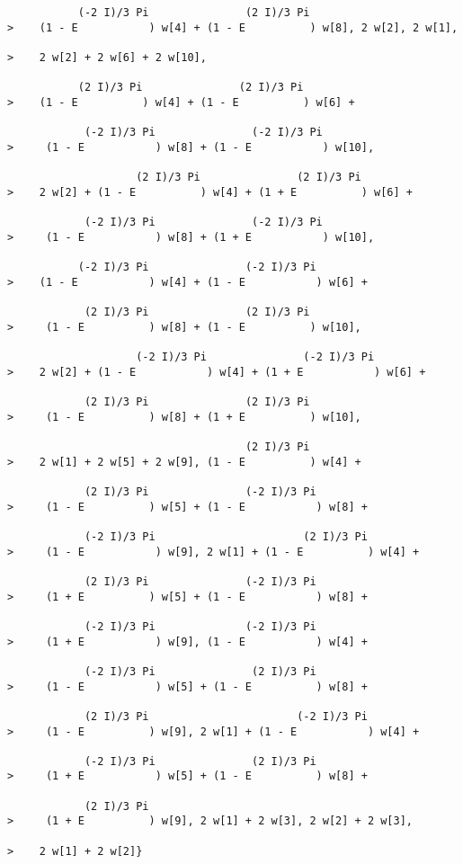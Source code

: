 \begin{verbatim}
           (-2 I)/3 Pi               (2 I)/3 Pi
>    (1 - E           ) w[4] + (1 - E          ) w[8], 2 w[2], 2 w[1], 
 
>    2 w[2] + 2 w[6] + 2 w[10], 
 
           (2 I)/3 Pi               (2 I)/3 Pi
>    (1 - E          ) w[4] + (1 - E          ) w[6] + 
 
            (-2 I)/3 Pi               (-2 I)/3 Pi
>     (1 - E           ) w[8] + (1 - E           ) w[10], 
 
                    (2 I)/3 Pi               (2 I)/3 Pi
>    2 w[2] + (1 - E          ) w[4] + (1 + E          ) w[6] + 
 
            (-2 I)/3 Pi               (-2 I)/3 Pi
>     (1 - E           ) w[8] + (1 + E           ) w[10], 
 
           (-2 I)/3 Pi               (-2 I)/3 Pi
>    (1 - E           ) w[4] + (1 - E           ) w[6] + 
 
            (2 I)/3 Pi               (2 I)/3 Pi
>     (1 - E          ) w[8] + (1 - E          ) w[10], 
 
                    (-2 I)/3 Pi               (-2 I)/3 Pi
>    2 w[2] + (1 - E           ) w[4] + (1 + E           ) w[6] + 
 
            (2 I)/3 Pi               (2 I)/3 Pi
>     (1 - E          ) w[8] + (1 + E          ) w[10], 
 
                                     (2 I)/3 Pi
>    2 w[1] + 2 w[5] + 2 w[9], (1 - E          ) w[4] + 
 
            (2 I)/3 Pi               (-2 I)/3 Pi
>     (1 - E          ) w[5] + (1 - E           ) w[8] + 
 
            (-2 I)/3 Pi                       (2 I)/3 Pi
>     (1 - E           ) w[9], 2 w[1] + (1 - E          ) w[4] + 
 
            (2 I)/3 Pi               (-2 I)/3 Pi
>     (1 + E          ) w[5] + (1 - E           ) w[8] + 
 
            (-2 I)/3 Pi              (-2 I)/3 Pi
>     (1 + E           ) w[9], (1 - E           ) w[4] + 
 
            (-2 I)/3 Pi               (2 I)/3 Pi
>     (1 - E           ) w[5] + (1 - E          ) w[8] + 
 
            (2 I)/3 Pi                       (-2 I)/3 Pi
>     (1 - E          ) w[9], 2 w[1] + (1 - E           ) w[4] + 
 
            (-2 I)/3 Pi               (2 I)/3 Pi
>     (1 + E           ) w[5] + (1 - E          ) w[8] + 
 
            (2 I)/3 Pi
>     (1 + E          ) w[9], 2 w[1] + 2 w[3], 2 w[2] + 2 w[3], 
 
>    2 w[1] + 2 w[2]}


\end{verbatim}

